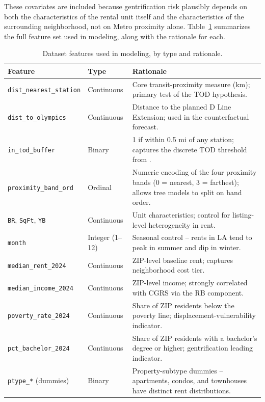 \documentclass[11pt]{article}
\begin{document}
These covariates are included because gentrification risk plausibly depends on both the characteristics of the rental unit itself and the characteristics of the surrounding neighborhood, not on Metro proximity alone. Table~\ref{tab:features} summarizes the full feature set used in modeling, along with the rationale for each.

\begin{table}[ht]
\centering
\caption{Dataset features used in modeling, by type and rationale.}
\label{tab:features}
\small
\begin{tabular}{p{} p{} p{}}
\toprule
\rowcolor{tableheader}
\textbf{Feature} & \textbf{Type} & \textbf{Rationale} \\
\midrule
\texttt{dist\_nearest\_station} & Continuous & Core transit-proximity measure (km); primary test of the TOD hypothesis. \\
\texttt{dist\_to\_olympics} & Continuous & Distance to the planned D Line Extension; used in the counterfactual forecast. \\
\texttt{in\_tod\_buffer} & Binary & 1 if within 0.5 mi of any station; captures the discrete TOD threshold from \citet{kahn2007gentrification}. \\
\texttt{proximity\_band\_ord} & Ordinal & Numeric encoding of the four proximity bands (0 = nearest, 3 = farthest); allows tree models to split on band order. \\
\texttt{BR}, \texttt{SqFt}, \texttt{YB} & Continuous & Unit characteristics; control for listing-level heterogeneity in rent. \\
\texttt{month} & Integer (1--12) & Seasonal control -- rents in LA tend to peak in summer and dip in winter. \\
\texttt{median\_rent\_2024} & Continuous & ZIP-level baseline rent; captures neighborhood cost tier. \\
\texttt{median\_income\_2024} & Continuous & ZIP-level income; strongly correlated with CGRS via the RB component. \\
\texttt{poverty\_rate\_2024} & Continuous & Share of ZIP residents below the poverty line; displacement-vulnerability indicator. \\
\texttt{pct\_bachelor\_2024} & Continuous & Share of ZIP residents with a bachelor's degree or higher; gentrification leading indicator. \\
\texttt{ptype\_*} (dummies) & Binary & Property-subtype dummies -- apartments, condos, and townhouses have distinct rent distributions. \\
\bottomrule
\end{tabular}
\end{table}
\end{document}
